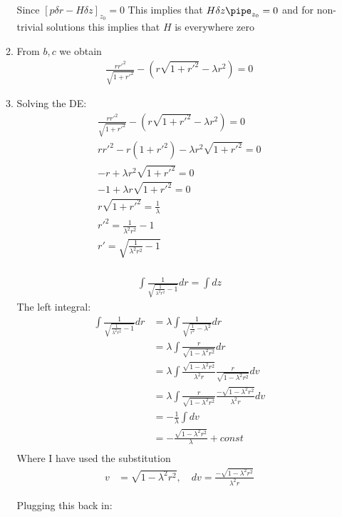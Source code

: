 \documentclass{X:/Documents/Coding/Latex/myassignment}
\begin{document}
\begin{enumerate}
\begin{enumerate}
	Since $[p \delta r - H \delta z]_{z_0} = 0$
	This implies that $H \delta z\pipe_{z_0} = 0$
	and for non-trivial solutions this implies that $H$ is everywhere zero
	\item From $b,c$ we obtain
	\begin{align*}
		\frac{rr'^2}{\sqrt{1+r'^2}} - \left(r\sqrt{1+r'^2} - \lambda r^2\right) = 0
	\end{align*}
	\item 
	Solving the DE:
	\begin{align*}
		\frac{rr'^2}{\sqrt{1+r'^2}} - \left(r\sqrt{1+r'^2} - \lambda r^2\right) = 0\\
		rr'^2 - r(1+r'^2) - \lambda r^2 \sqrt{1 + r'^2} =0 \\
		-r + \lambda r^2 \sqrt{1+r'^2} = 0\\
		-1 + \lambda r \sqrt{1+r'^2} = 0\\
		r \sqrt{1+r'^2} = \frac{1}{\lambda}\\
		r'^2 = \frac{1}{\lambda^2 r^2} -1\\
		r' = \sqrt{\frac{1}{\lambda^2 r^2} -1}\\
	\end{align*}

	\begin{align*}
		\int \frac{1}{\sqrt{\frac{1}{\lambda^2 r^2} -1}} dr = \int dz
	\end{align*}
	The left integral:
	\begin{align*}
		\int \frac{1}{\sqrt{\frac{1}{\lambda^2 r^2} -1}} dr &=\lambda \int \frac{1}{\sqrt{\frac{1}{r^2} - \lambda^2 }} dr\\
		&=\lambda \int \frac{r}{\sqrt{1 - \lambda^2 r^2}} dr\\
		&= \lambda \int \frac{\sqrt{1 - \lambda^2 r^2}}{\lambda^2 r} \frac{r}{\sqrt{1 - \lambda^2 r^2}} dv\\&= \lambda \int  \frac{r}{\sqrt{1 - \lambda^2 r^2}} \frac{-\sqrt{1 - \lambda^2 r^2}}{\lambda^2 r}dv\\
		&= -\frac{1}{\lambda} \int dv\\
		&= -\frac{\sqrt{1 - \lambda^2 r^2}}{\lambda}  + const\\
	\end{align*}
	Where I have used the substitution
	\begin{align*}
		v &= \sqrt{1- \lambda^2 r^2}, \quad dv = \frac{-\sqrt{1- \lambda^2 r^2}}{\lambda^2 r}
	\end{align*}


	Plugging this back in:


\end{enumerate}
\end{enumerate}
\end{document}
